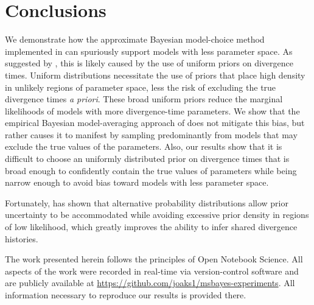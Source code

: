 \section{Conclusions}
We demonstrate how the approximate Bayesian model-choice method implemented in
\msb can spuriously support models with less parameter space.
As suggested by \citet{Oaks2012}, this is likely caused by the use of uniform
priors on divergence times.
Uniform distributions necessitate the use of priors that place high density in
unlikely regions of parameter space, less the risk of excluding the true
divergence times \emph{a priori}.
These broad uniform priors reduce the marginal likelihoods of models with more
divergence-time parameters.
We show that the empirical Bayesian model-averaging approach of
\citet{Hickerson2013} does not mitigate this bias, but rather causes it to
manifest by sampling predominantly from models that may exclude the true values
of the parameters.
Also, our results show that it is difficult to choose an uniformly distributed
prior on divergence times that is broad enough to confidently contain the true
values of parameters while being narrow enough to avoid bias toward models with
less parameter space.

Fortunately, \citet{Oaks2014dpp} has shown that alternative probability
distributions allow prior uncertainty to be accommodated while avoiding
excessive prior density in regions of low likelihood, which greatly improves
the ability to infer shared divergence histories.


The work presented herein follows the principles of Open Notebook Science.
All aspects of the work were recorded in real-time via version-control software
and are publicly available at
\href{https://github.com/joaks1/msbayes-experiments}{\url{https://github.com/joaks1/msbayes-experiments}}.
All information necessary to reproduce our results is provided there.

